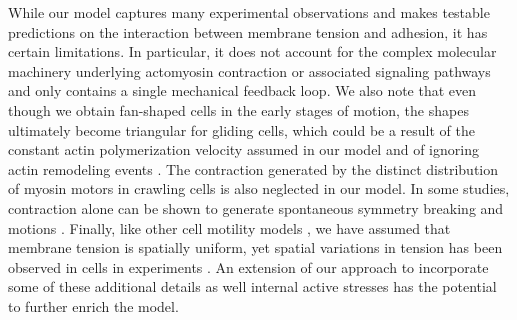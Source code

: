 \documentclass[12pt]{article}
\begin{document}
        
        While our model captures many experimental observations and makes testable predictions on the interaction between membrane tension and adhesion, it has certain limitations.
        In particular, it does not account for the complex molecular machinery underlying actomyosin contraction  or associated signaling pathways and only contains a single mechanical feedback loop. 
        We also note that even though we obtain fan-shaped cells in the early stages of motion, the shapes ultimately become triangular for gliding cells, which could be a result of the constant actin polymerization velocity assumed in our model and of ignoring actin remodeling events \cite{Xiong2010,rangamani2011,mogilner2020experiment,nickaeen2017free}.
        The contraction generated by the distinct distribution of myosin motors in crawling cells is also neglected in our model. 
        In some studies, contraction alone can be shown to generate spontaneous symmetry breaking and motions \cite{recho2013contraction}. 
        Finally, like other cell motility models \cite{shao2010computational,ziebert2012model,barnhart2015balance}, we have assumed that membrane tension is spatially uniform, yet spatial variations in tension has been observed in cells in experiments \cite{Shi2018-wa}.
        An extension of our approach to incorporate some of these additional details as well internal active stresses has the potential to further enrich the model. 
             

\normalem


\end{document}
